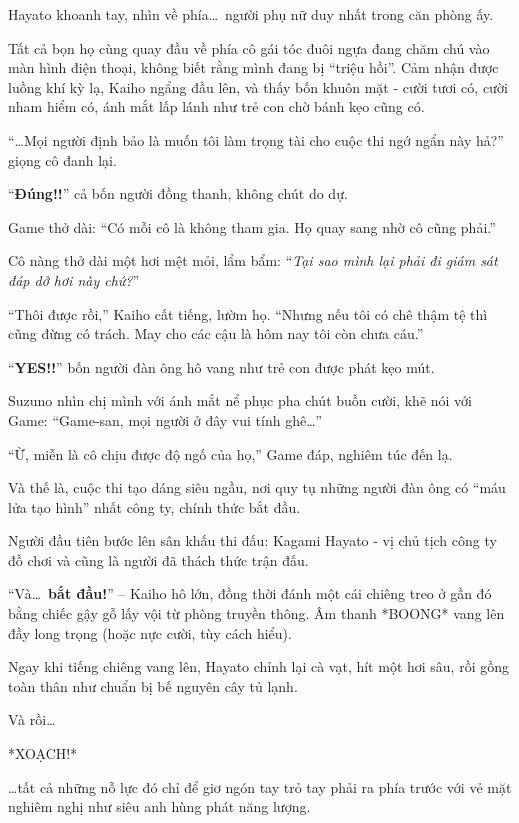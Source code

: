 \documentclass[../main.tex]{subfiles}
\begin{document}
Hayato khoanh tay, nhìn về phía\dots\ người phụ nữ duy nhất trong căn phòng ấy.

Tất cả bọn họ cùng quay đầu về phía cô gái tóc đuôi ngựa đang chăm chú vào màn hình điện thoại, không biết rằng mình đang bị ``triệu hồi''. Cảm nhận được luồng khí kỳ lạ, Kaiho ngẩng đầu lên, và thấy bốn khuôn mặt - cười tươi có, cười nham hiểm có, ánh mắt lấp lánh như trẻ con chờ bánh kẹo cũng có.

``\dots Mọi người định bảo là muốn tôi làm trọng tài cho cuộc thi ngớ ngẩn này hả?'' giọng cô đanh lại.

``\textbf{Đúng!!}'' cả bốn người đồng thanh, không chút do dự.

Game thở dài: ``Có mỗi cô là không tham gia. Họ quay sang nhờ cô cũng phải.''

Cô nàng thở dài một hơi mệt mỏi, lẩm bẩm: ``\textit{Tại sao mình lại phải đi giám sát đáp dở hơi này chứ?}''

``Thôi được rồi,'' Kaiho cất tiếng, lườm họ. ``Nhưng nếu tôi có chê thậm tệ thì cũng đừng có trách. May cho các cậu là hôm nay tôi còn chưa cáu.''

``\textbf{YES!!}'' bốn người đàn ông hô vang như trẻ con được phát kẹo mút.

Suzuno nhìn chị mình với ánh mắt nể phục pha chút buồn cười, khẽ nói với Game: ``Game-san, mọi người ở đây vui tính ghê\dots''

``Ừ, miễn là cô chịu được độ ngố của họ,'' Game đáp, nghiêm túc đến lạ.

Và thế là, cuộc thi tạo dáng siêu ngầu, nơi quy tụ những người đàn ông có ``máu lửa tạo hình'' nhất công ty, chính thức bắt đầu.

\ct

Người đầu tiên bước lên sân khấu thi đấu: Kagami Hayato - vị chủ tịch công ty đồ chơi và cũng là người đã thách thức trận đấu.

``Và\dots\ \textbf{bắt đầu!}'' – Kaiho hô lớn, đồng thời đánh một cái chiêng treo ở gần đó bằng chiếc gậy gỗ lấy vội từ phòng truyền thông. Âm thanh *BOONG* vang lên đầy long trọng (hoặc nực cười, tùy cách hiểu).

Ngay khi tiếng chiêng vang lên, Hayato chỉnh lại cà vạt, hít một hơi sâu, rồi gồng toàn thân như chuẩn bị bế nguyên cây tủ lạnh.

Và rồi\dots

*XOẠCH!*


\dots tất cả những nỗ lực đó chỉ để giơ ngón tay trỏ tay phải ra phía trước với vẻ mặt nghiêm nghị như siêu anh hùng phát năng lượng.
\end{document}
